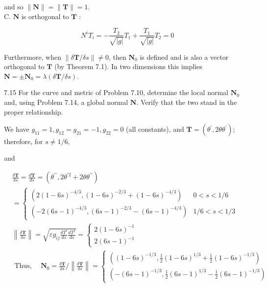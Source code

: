 \documentclass[10pt]{article}
\begin{document}
and so $\|\mathbf{N}\|=\|\mathbf{T}\|=1$.\\
C. $\mathbf{N}$ is orthogonal to $\mathbf{T}$ :

$$
N^{i} T_{i}=-\frac{T_{2}}{\sqrt{|g|}} T_{1}+\frac{T_{1}}{\sqrt{|g|}} T_{2}=0
$$

Furthermore, when $\|\delta \mathbf{T} / \delta s\| \neq 0$, then $\mathbf{N}_{0}$ is defined and is also a vector orthogonal to $\mathbf{T}$ (by Theorem 7.1). In two dimensions this implies $\mathbf{N}= \pm \mathbf{N}_{0}=\lambda(\delta \mathbf{T} / \delta s)$.

7.15 For the curve and metric of Problem 7.10, determine the local normal $\mathbf{N}_{0}$ and, using Problem 7.14, a global normal $\mathbf{N}$. Verify that the two stand in the proper relationship.

We have $g_{11}=1, g_{12}=g_{21}=-1, g_{22}=0$ (all constants), and $\mathbf{T}=\left(\theta^{\prime}, 2 \theta \theta^{\prime}\right)$; therefore, for $s \neq 1 / 6$,

and

$$
\begin{aligned}
& \frac{\delta \mathbf{T}}{\delta s}=\frac{d \mathbf{T}}{d s}=\left(\theta^{\prime \prime}, 2 \theta^{\prime 2}+2 \theta \theta^{\prime \prime}\right) \\
& =\left\{\begin{array}{lr}
\left(2(1-6 s)^{-4 / 3},(1-6 s)^{-2 / 3}+(1-6 s)^{-4 / 3}\right) & 0<s<1 / 6 \\
\left(-2(6 s-1)^{-4 / 3},(6 s-1)^{-2 / 3}-(6 s-1)^{-4 / 3}\right) & 1 / 6<s<1 / 3
\end{array}\right. \\
& \left\|\frac{\delta \mathbf{T}}{\delta s}\right\|=\sqrt{\varepsilon g_{i j} \frac{d T^{i}}{d s} \frac{d T^{j}}{d s}}=\left\{\begin{array}{l}
2(1-6 s)^{-1} \\
2(6 s-1)^{-1}
\end{array}\right. \\
& \text { Thus, } \quad \mathbf{N}_{0}=\frac{\delta \mathbf{T}}{\delta s} /\left\|\frac{\delta \mathbf{T}}{\delta s}\right\|=\left\{\begin{array}{l}
\left((1-6 s)^{-1 / 3}, \frac{1}{2}(1-6 s)^{1 / 3}+\frac{1}{2}(1-6 s)^{-1 / 3}\right) \\
\left(-(6 s-1)^{-1 / 3}, \frac{1}{2}(6 s-1)^{1 / 3}-\frac{1}{2}(6 s-1)^{-1 / 3}\right)
\end{array}\right.
\end{aligned}
$$
\end{document}
